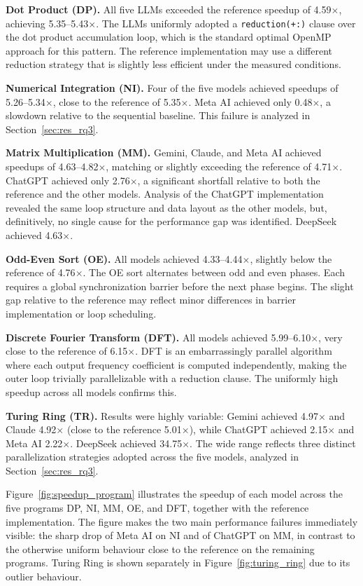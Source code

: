 \textbf{Dot Product (DP).} All five LLMs exceeded the reference speedup of 4.59$\times$, achieving 5.35--5.43$\times$. The LLMs uniformly adopted a \texttt{reduction(+:)} clause over the dot product accumulation loop, which is the standard optimal OpenMP approach for this pattern. The reference implementation may use a different reduction strategy that is slightly less efficient under the measured conditions.

\textbf{Numerical Integration (NI).} Four of the five models achieved speedups of 5.26--5.34$\times$, close to the reference of 5.35$\times$. Meta AI achieved only 0.48$\times$, a slowdown relative to the sequential baseline. This failure is analyzed in Section~\ref{sec:res_rq3}.

\textbf{Matrix Multiplication (MM).} Gemini, Claude, and Meta AI achieved speedups of 4.63--4.82$\times$, matching or slightly exceeding the reference of 4.71$\times$. ChatGPT achieved only 2.76$\times$, a significant shortfall relative to both the reference and the other models. Analysis of the ChatGPT implementation revealed the same loop structure and data layout as the other models, but, definitively, no single cause for the performance gap was identified. DeepSeek achieved 4.63$\times$.

\textbf{Odd-Even Sort (OE).} All models achieved 4.33--4.44$\times$, slightly below the reference of 4.76$\times$. 
The OE sort alternates between odd and even phases.
Each requires a global synchronization barrier before the next phase begins. 
The slight gap relative to the reference may reflect minor differences in barrier implementation or loop scheduling.

\textbf{Discrete Fourier Transform (DFT).} All models achieved 5.99--6.10$\times$, very close to the reference of 6.15$\times$. DFT is an embarrassingly parallel algorithm where each output frequency coefficient is computed independently, making the outer loop trivially parallelizable with a reduction clause. The uniformly high speedup across all models confirms this.

\textbf{Turing Ring (TR).} Results were highly variable: Gemini achieved 4.97$\times$ and Claude 4.92$\times$ (close to the reference 5.01$\times$), while ChatGPT achieved 2.15$\times$ and Meta AI 2.22$\times$. DeepSeek achieved 34.75$\times$. The wide range reflects three distinct parallelization strategies adopted across the five models, analyzed in Section~\ref{sec:res_rq3}.

Figure~\ref{fig:speedup_program} illustrates the speedup of each model across the five programs DP, NI, MM, OE, and DFT, together with the reference implementation. The figure makes the two main performance failures immediately visible: the sharp drop of Meta AI on NI and of ChatGPT on MM, in contrast to the otherwise uniform behaviour close to the reference on the remaining programs. Turing Ring is shown separately in Figure~\ref{fig:turing_ring} due to its outlier behaviour.

